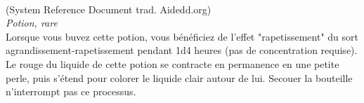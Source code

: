 \\
{\small (System Reference Document trad. Aidedd.org)}\\
{\small \it Potion, rare}\\
Lorsque vous buvez cette potion, vous bénéficiez de l'effet "rapetissement" du sort agrandissement-rapetissement pendant 1d4 heures (pas de concentration requise). Le rouge du liquide de cette potion se contracte en permanence en une petite perle, puis s'étend pour colorer le liquide clair autour de lui. Secouer la bouteille n'interrompt pas ce processus. \\

